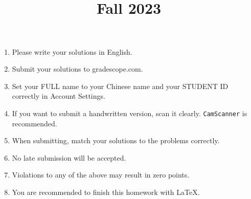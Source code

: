 \documentclass[11pt, addpoints, answers]{exam}
\title{
	\CourseName\\
	Fall 2023\\
	\HomeworkNO
}
\author{}
\date{\DueDate}
\newcommand{\ttt}{\texttt}
\begin{document}
\maketitle

\begin{enumerate}
	\item Please write your solutions in English.
	\item Submit your solutions to gradescope.com.
	\item Set your FULL name to your Chinese name and your STUDENT ID correctly in Account Settings.
	\item If you want to submit a handwritten version, scan it clearly. \ttt{CamScanner} is recommended.
	\item When submitting, match your solutions to the problems correctly.
	\item No late submission will be accepted.
	\item Violations to any of the above may result in zero points.
 	\item You are recommended to finish this homework with \LaTeX.
\end{enumerate}

\newpage

\begin{questions}
    
    
    \newpage
    
    
    
    \newpage
    
    
    
    \newpage
    
    
\end{questions}
\end{document}

